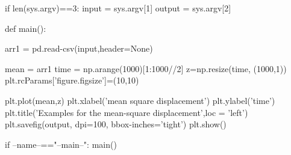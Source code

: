 \documentclass[12pt, a4paper, twoside]{report}
\begin{document}
if len(sys.argv)==3:\newline
\hspace*{10mm}    input = sys.argv[1]\newline
\hspace*{10mm}    output = sys.argv[2]\newline


def main():\newline


\hspace*{10mm}    arr1 = pd.read-csv(input,header=None)\newline


\hspace*{10mm}    mean = arr1\newline
\hspace*{10mm}    time = np.arange(1000)[1:1000//2]\newline
\hspace*{10mm}    z=np.resize(time, (1000,1))\newline
\hspace*{10mm}    plt.rcParams['figure.figsize']=(10,10)\newline

\hspace*{10mm}    plt.plot(mean,z)\newline
\hspace*{10mm}    plt.xlabel('mean square displacement')\newline
\hspace*{10mm}    plt.ylabel('time')\newline\newline
\hspace*{10mm}   plt.title('Examples for the mean-square displacement',loc = 'left')\newline
\hspace*{10mm}    plt.savefig(output, dpi=100, bbox-inches='tight')\newline
\hspace*{10mm}    plt.show()\newline

if --name--=="--main--":\newline
\hspace*{10mm}    main()
\end{document}
